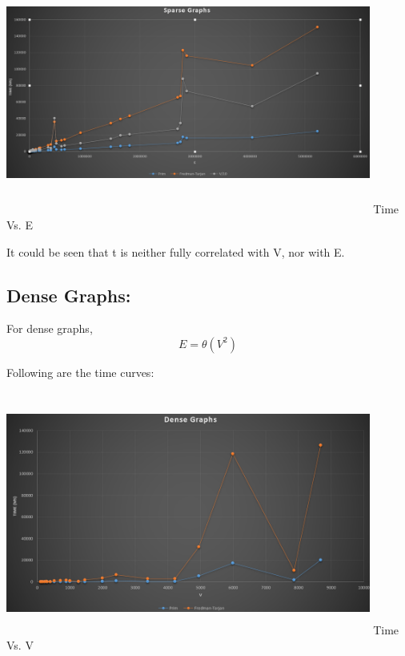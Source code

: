 \documentclass[]{article}
\begin{document}
\begin{center}
	\includegraphics[width=12cm, height=8cm]{Sparse_E.png}
	Time Vs. E
\end{center}
	
	It could be seen that t is neither fully correlated with V, nor with E. 
			

\subsection{Dense Graphs:}

	For dense graphs, \[ E = \theta(V^2)\]
	
	Following are the time curves:


\begin{center}
	\includegraphics[width=12cm, height=8cm]{Dense_V.png}
	Time Vs. V
\end{center}
\end{document}
